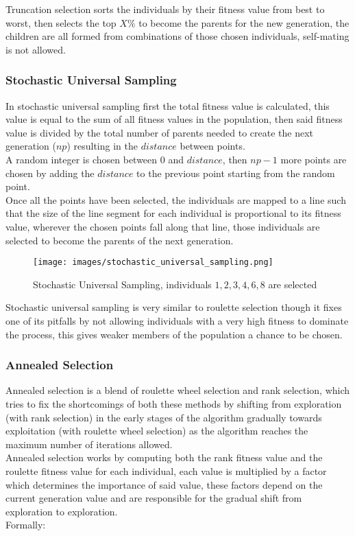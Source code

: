 	Truncation selection sorts the individuals by their fitness value from best to worst, then selects the top $X\%$ to become the parents for the new generation, the children are all formed from combinations of those chosen individuals, self-mating is not allowed.

	\subsubsection{Stochastic Universal Sampling}

	In stochastic universal sampling first the total fitness value is calculated, this value is equal to the sum of all fitness values in the population, then said fitness value is divided by the total number of parents needed to create the next generation ($np$) resulting in the $distance$ between points.
	\\A random integer is chosen between 0 and $distance$, then $np-1$ more points are chosen by adding the $distance$ to the previous point starting from the random point.
	\\Once all the points have been selected, the individuals are mapped to a line such that the size of the line segment for each individual is proportional to its fitness value, wherever the chosen points fall along that line, those individuals are selected to become the parents of the next generation.

	\begin{figure}[!ht]
	\centering
	\texttt{[image: images/stochastic\_universal\_sampling.png]}
	\caption{Stochastic Universal Sampling, individuals ${1,2,3,4,6,8}$ are selected}
	\label{fig:Stochastic universal sampling}
	\end{figure}

	Stochastic universal sampling is very similar to roulette selection though it fixes one of its pitfalls by not allowing individuals with a very high fitness to dominate the process, this gives weaker members of the population a chance to be chosen.

	\subsubsection{Annealed Selection}

	Annealed selection \parencite{Jyotishree} is a blend of roulette wheel selection and rank selection, which tries to fix the shortcomings of both these methods by shifting from exploration (with rank selection) in the early stages of the algorithm gradually towards exploitation (with roulette wheel selection) as the algorithm reaches the maximum number of iterations allowed.
	\\Annealed selection works by computing both the rank fitness value and the roulette fitness value for each individual, each value is multiplied by a factor which determines the importance of said value, these factors depend on the current generation value and are responsible for the gradual shift from exploration to exploration.
	\\Formally:

